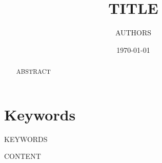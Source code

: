 \documentclass[11pt,a4paper]{article}
\title{{{TITLE}}}
\author{{{AUTHORS}}}
\date{\today}
\begin{document}
\maketitle

\begin{abstract}
{{ABSTRACT}}
\end{abstract}

\section*{Keywords}
{{KEYWORDS}}

{{CONTENT}}



\end{document}
